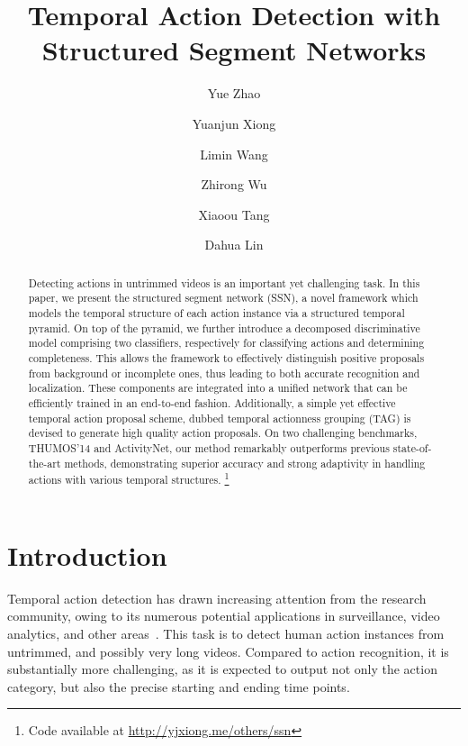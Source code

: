 \documentclass[10pt,twocolumn,letterpaper]{article}
\begin{document}
\title{Temporal Action Detection with Structured Segment Networks}

\author[1]{Yue Zhao}
\author[1]{Yuanjun Xiong}
\author[2]{Limin Wang}
\author[1]{Zhirong Wu}
\author[1]{Xiaoou Tang}
\author[1]{Dahua Lin}



\maketitle



\begin{abstract}
Detecting actions in untrimmed videos is an important yet
challenging task. 
In this paper, we present the structured segment network (SSN), a novel framework
which models the temporal structure of each action instance
via a structured temporal pyramid.
On top of the pyramid, we further introduce a decomposed discriminative model comprising two classifiers, respectively for classifying actions
and determining completeness. This allows the framework to effectively
distinguish positive proposals from background or incomplete ones,
thus leading to both accurate recognition and localization.
These components are integrated into a unified network that
can be efficiently trained in an end-to-end fashion.
Additionally, a simple yet effective
temporal action proposal scheme, dubbed temporal actionness grouping (TAG) is devised to generate high quality action proposals.
On two challenging benchmarks,
THUMOS’14 and ActivityNet, our method remarkably outperforms previous
state-of-the-art methods, demonstrating superior accuracy and strong adaptivity
in handling actions with various temporal structures.
\footnote{Code available at \url{http://yjxiong.me/others/ssn}}
\end{abstract}
 






\section{Introduction}
\label{sec:intro}

Temporal action detection has drawn increasing attention from the research community,
owing to its numerous potential applications in surveillance, video analytics, and other areas~\cite{Oneata2013FV,Mettes2015Bofrag,Yeung2016FrameGlimpse,Shou2016SCNN}.
This task is to detect human action instances from untrimmed, and possibly very long videos.
Compared to action recognition, it is substantially more challenging,
as it is expected to output not only the action category, but also the precise starting and ending time points.
\end{document}

